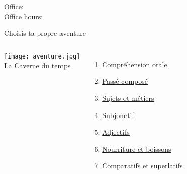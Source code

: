 \documentclass{beamer}
\subtitle[Révision: Examen 2]{Révision de l'examen 2}
\begin{document}
  \begin{frame}
    \titlepage
    \tiny{Office: \\
          Office hours: }
  \end{frame}

  \begin{frame}{Choisis ta propre aventure \\ }
    \hypertarget{début}{}
    \begin{columns}
        \begin{center}
          \texttt{[image: aventure.jpg]} \\
          La Caverne du temps
        \end{center}
        \begin{enumerate}
          \item \hyperlink{orale}{Compréhension orale}
          \item \hyperlink{mort}{Passé composé}
          \item \hyperlink{sujets}{Sujets et métiers}
          \item \hyperlink{mort}{Subjonctif}
          \item \hyperlink{adjectifs}{Adjectifs}
          \item \hyperlink{mort}{Nourriture et boissons}
          \item \hyperlink{comparatifs}{Comparatifs et superlatifs}
        \end{enumerate}
    \end{columns}
  \end{frame}
\end{document}
